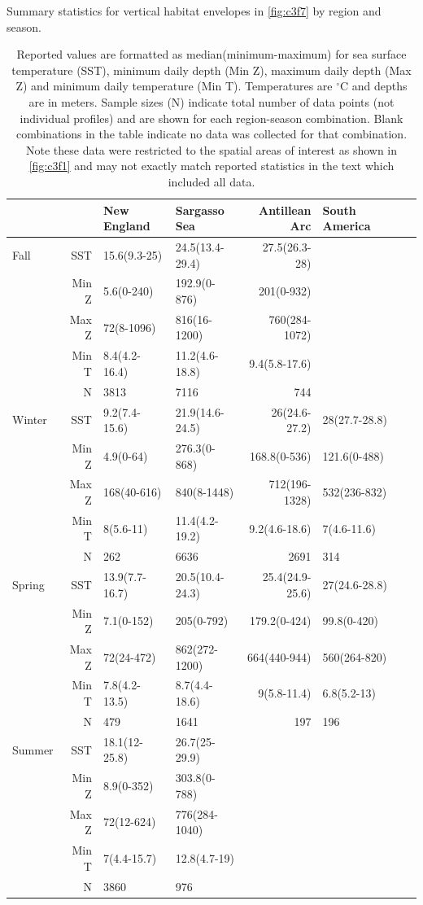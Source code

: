 \begin{table}
\caption[Vertical habitat envelope summary statistics]{Summary statistics for vertical habitat envelopes in \cref{fig:c3f7} by region and season.}
\label{tab:c3t2}
\centering
\begin{tabular}[t]{lrllrlll}
\toprule
 &  & \textbf{New England} & \textbf{Sargasso Sea} & \textbf{Antillean Arc} & \textbf{South America} \\
\midrule
Fall & SST & 15.6(9.3-25) & 24.5(13.4-29.4) & 27.5(26.3-28) & \\
 & Min Z & 5.6(0-240) & 192.9(0-876) & 201(0-932) & \\
 & Max Z & 72(8-1096) & 816(16-1200) & 760(284-1072) & \\
 & Min T & 8.4(4.2-16.4) & 11.2(4.6-18.8) & 9.4(5.8-17.6) & \\
 & N & 3813 & 7116 & 744 & \\
\addlinespace
Winter & SST & 9.2(7.4-15.6) & 21.9(14.6-24.5) & 26(24.6-27.2) & 28(27.7-28.8)\\
 & Min Z & 4.9(0-64) & 276.3(0-868) & 168.8(0-536) & 121.6(0-488)\\
 & Max Z & 168(40-616) & 840(8-1448) & 712(196-1328) & 532(236-832)\\
 & Min T & 8(5.6-11) & 11.4(4.2-19.2) & 9.2(4.6-18.6) & 7(4.6-11.6)\\
 & N & 262 & 6636 & 2691 & 314\\
\addlinespace
Spring & SST & 13.9(7.7-16.7) & 20.5(10.4-24.3) & 25.4(24.9-25.6) & 27(24.6-28.8)\\
 & Min Z & 7.1(0-152) & 205(0-792) & 179.2(0-424) & 99.8(0-420)\\
 & Max Z & 72(24-472) & 862(272-1200) & 664(440-944) & 560(264-820)\\
 & Min T & 7.8(4.2-13.5) & 8.7(4.4-18.6) & 9(5.8-11.4) & 6.8(5.2-13)\\
 & N & 479 & 1641 & 197 & 196\\
\addlinespace
Summer & SST & 18.1(12-25.8) & 26.7(25-29.9) &  & \\
 & Min Z & 8.9(0-352) & 303.8(0-788) &  & \\
 & Max Z & 72(12-624) & 776(284-1040) &  & \\
 & Min T & 7(4.4-15.7) & 12.8(4.7-19) &  & \\
 & N & 3860 & 976 &  & \\
\bottomrule
\end{tabular}
\caption*{Reported values are formatted as median(minimum-maximum) for sea surface temperature (SST), minimum daily depth (Min Z), maximum daily depth (Max Z) and minimum daily temperature (Min T). Temperatures are $^{\circ}$C and depths are in meters. Sample sizes (N) indicate total number of data points (not individual profiles) and are shown for each region-season combination. Blank combinations in the table indicate no data was collected for that combination. Note these data were restricted to the spatial areas of interest as shown in \cref{fig:c3f1} and may not exactly match reported statistics in the text which included all data.}
\end{table}